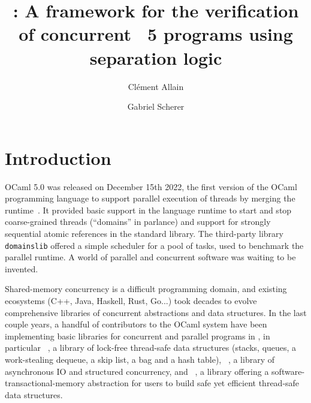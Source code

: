 \documentclass[acmsmall,screen,review,anonymous]{acmart}
\begin{document}

\title{
  \Zoo: A framework for the verification of concurrent \OCaml~5 programs using separation logic
}

\author{Clément Allain}

\author{Gabriel Scherer}

\begin{abstract}
    
\end{abstract}

\maketitle


\section{Introduction}
\label{sec:introduction}

OCaml 5.0 was released on December 15th 2022, the first version of the
OCaml programming language to support parallel execution of \OCaml
threads by merging the \MulticoreOCaml
runtime~\citep*{multicore-ocaml}. It provided basic support in the
language runtime to start and stop coarse-grained threads (``domains''
in \OCaml parlance) and support for strongly sequential atomic
references in the standard library. The third-party library
\texttt{domainslib} offered a simple scheduler for a pool of tasks,
used to benchmark the parallel runtime. A world of parallel and
concurrent software was waiting to be invented.

Shared-memory concurrency is a difficult programming domain, and
existing ecosystems (C++, Java, Haskell, Rust, Go...) took decades to
evolve comprehensive libraries of concurrent abstractions and data
structures. In the last couple years, a handful of contributors to the
OCaml system have been implementing basic libraries for concurrent and
parallel programs in \OCaml, in particular \Saturn~\citep*{saturn},
a library of lock-free thread-safe data structures (stacks, queues,
a work-stealing dequeue, a skip list, a bag and a hash table),
\Eio~\citep*{eio}, a library of asynchronous IO and structured
concurrency, and \Kcas~\citep*{kcas}, a library offering
a software-transactional-memory abstraction for users to build safe
yet efficient thread-safe data structures.
\end{document}
